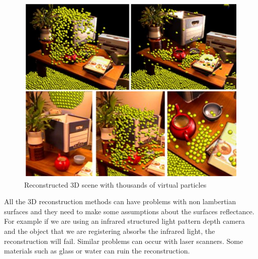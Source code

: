 \begin{figure}[h!]
\begin{center}
\includegraphics[scale=0.34]{images/izadi}
\caption{Reconstructed 3D scene with thousands of virtual particles}
\label{fig:izadi}
\end{center}
\end{figure}


All the 3D reconstruction methods can have problems with non lambertian 
surfaces and they need to make some assumptions about the surfaces reflectance. For example if we are using 
an infrared structured light pattern depth camera and the object that we are registering absorbs the infrared light, 
the reconstruction will fail. Similar problems can occur with laser scanners. 
Some materials such as glass or water can ruin the reconstruction.











